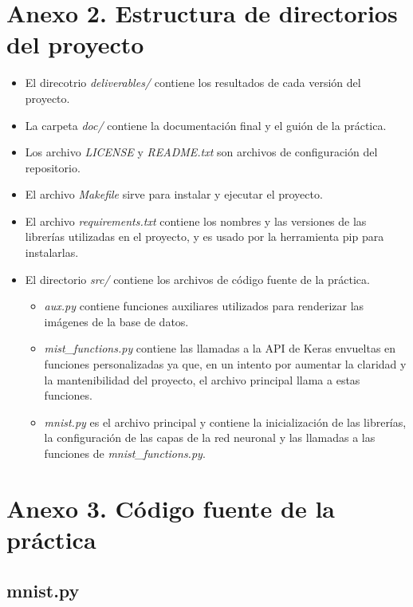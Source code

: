 \newpage
\section{Anexo 2. Estructura de directorios del proyecto}

\begin{itemize}
  \item El direcotrio \textit{deliverables/} contiene los resultados de cada versión del proyecto.
  \item La carpeta \textit{doc/} contiene la documentación final y el guión de la práctica.
  \item Los archivo \textit{LICENSE} y \textit{README.txt} son archivos de configuración del repositorio.
  \item El archivo \textit{Makefile} sirve para instalar y ejecutar el proyecto.
  \item El archivo \textit{requirements.txt} contiene los nombres y las versiones de las librerías utilizadas en el proyecto, y es usado por la herramienta pip para instalarlas.
  \item El directorio \textit{src/} contiene los archivos de código fuente de la práctica.
  \begin{itemize}
    \item \textit{aux.py} contiene funciones auxiliares utilizados para renderizar las imágenes de la base de datos.
    \item \textit{mist\_functions.py} contiene las llamadas a la API de Keras envueltas en funciones personalizadas ya que, en un intento por aumentar la claridad y la mantenibilidad del proyecto, el archivo principal llama a estas funciones.
    \item \textit{mnist.py} es el archivo principal y contiene la inicialización de las librerías, la configuración de las capas de la red neuronal y las llamadas a las funciones de \textit{mnist\_functions.py}.
  \end{itemize}
\end{itemize}


\newpage
\section{Anexo 3. Código fuente de la práctica}

\subsection{mnist.py}


